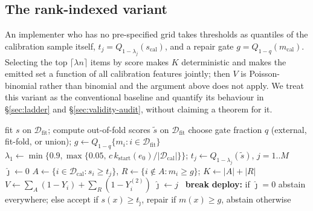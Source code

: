 \subsection{The rank-indexed variant}
\label{sec:rank}

An implementer who has no pre-specified grid takes thresholds as quantiles of the calibration
sample itself, $t_j=Q_{1-\lambda_j}(s_{\mathrm{cal}})$, and a repair gate $g=Q_{1-q}(m_{\mathrm{cal}})$. Selecting the top
$\lceil\lambda n\rceil$ items by score makes $K$ deterministic and makes the emitted set a function of all calibration
features jointly; then $V$ is Poisson-binomial rather than binomial and the argument above does not apply.
We treat this variant as the conventional baseline and quantify its behaviour in
\S\ref{sec:ladder} and \S\ref{sec:validity-audit}, without claiming a theorem for it.

\begin{algorithm}[t]
\caption{CCRC. Folds $\mathcal D_{\mathrm{fit}},\mathcal D_{\mathrm{cal}}$ are disjoint and unions of images; $\alpha,\delta,e_0,c$ are fixed in advance.}
\label{alg:ccrc}
\begin{algorithmic}[1]
\State fit $s$ on $\mathcal D_{\mathrm{fit}}$; compute out-of-fold scores $\tilde s$ on $\mathcal D_{\mathrm{fit}}$
\State choose gate fraction $q$ (external, fit-fold, or union); $g\gets Q_{1-q}\{m_i:i\in\mathcal D_{\mathrm{fit}}\}$
\State $\lambda_1\gets\min\{0.9,\max\{0.05,\,c\,k_{\mathrm{start}}(e_0)/|\mathcal D_{\mathrm{cal}}|\}\}$; $t_j\gets Q_{1-\lambda_j}(\tilde s)$, $j=1..M$
\State $\hat\jmath\gets0$
  \State $A\gets\{i\in\mathcal D_{\mathrm{cal}}:s_i\ge t_j\}$, $R\gets\{i\notin A:m_i\ge g\}$; $K\gets|A|+|R|$
  \State $V\gets\sum_{A}(1-Y_i)+\sum_{R}(1-Y^{(2)}_i)$
   $\hat\jmath\gets j$ \Else\ \textbf{break} \EndIf
\EndFor
\State \textbf{deploy:} if $\hat\jmath=0$ abstain everywhere; else accept if $s(x)\ge t_{\hat\jmath}$, repair if $m(x)\ge g$, abstain otherwise
\end{algorithmic}
\end{algorithm}
